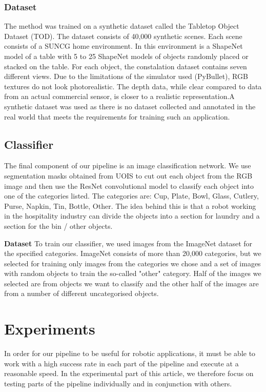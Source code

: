 \documentclass[10pt,twocolumn,letterpaper]{article}
\begin{document}
\subsubsection{Dataset}
The method was trained on a synthetic dataset called the Tabletop Object Dataset (TOD). The dataset consists of 40,000 synthetic scenes. Each scene consists of a SUNCG \cite{Song_Yu_Zeng_Chang_Savva_Funkhouser_2016} home environment. In this environment is a ShapeNet \cite{Chang_Funkhouser_Guibas_Hanrahan_Huang_Li_Savarese_Savva_Song_Su_et} model of a table with 5 to 25 ShapeNet \cite{Chang_Funkhouser_Guibas_Hanrahan_Huang_Li_Savarese_Savva_Song_Su_et} models of objects randomly placed or stacked on the table. For each object, the constalation dataset contains seven different views. Due to the limitations of the simulator used (PyBullet), RGB textures do not look photorealistic. The depth data, while clear compared to data from an actual commercial sensor, is closer to a realistic representation.A synthetic dataset was used as there is no dataset collected and annotated in the real world that meets the requirements for training such an application.


\subsection{Classifier}
The final component of our pipeline is an image classification network. We use segmentation masks obtained from UOIS to cut out each object from the RGB image and then use the ResNet \cite{He_Zhang_Ren_Sun_2015} convolutional model to classify each object into one of the categories listed. The categories are: Cup, Plate, Bowl, Glass, Cutlery, Purse, Napkin, Tin, Bottle, Other. The idea behind this is that a robot working in the hospitality industry can divide the objects into a section for laundry and a section for the bin / other objects.

\textbf{Dataset}
To train our classifier, we used images from the ImageNet dataset for the specified categories. ImageNet consists of more than 20,000 categories, but we selected for training only images from the categories we chose and a set of images with random objects to train the so-called "other" category. Half of the images we selected are from objects we want to classify and the other half of the images are from a number of different uncategorised objects.


\section{Experiments}
In order for our pipeline to be useful for robotic applications, it must be able to work with a high success rate in each part of the pipeline and execute at a reasonable speed. In the experimental part of this article, we therefore focus on testing parts of the pipeline individually and in conjunction with others.
\end{document}
